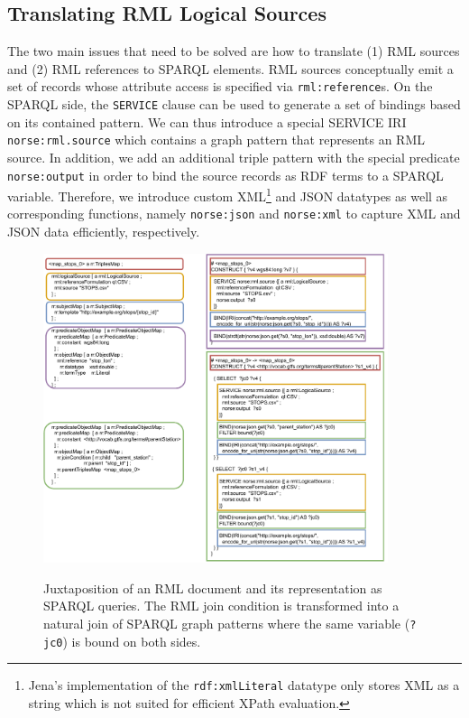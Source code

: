 \subsection{Translating RML Logical Sources}\label{sec:NORSE}
The two main issues that need to be solved are how to translate (1) RML sources and (2) RML references to SPARQL elements.
RML sources conceptually emit a set of records whose attribute access is specified via \texttt{rml:reference}s.
On the SPARQL side, the \texttt{SERVICE} clause can be used to generate a set of bindings based on its contained pattern.
We can thus introduce a special SERVICE IRI \texttt{norse:rml.source} which contains a graph pattern that represents an RML source.
In addition, we add an additional triple pattern with the special predicate \texttt{norse:output} in order to bind the source records as RDF terms to a SPARQL variable.
Therefore, we introduce custom XML\footnote{Jena's implementation of the \texttt{rdf:xmlLiteral} datatype only stores XML as a string which is not suited for efficient XPath evaluation.} and JSON datatypes as well as corresponding functions, namely \texttt{norse:json} and \texttt{norse:xml} to capture XML and JSON data efficiently, respectively.


\begin{figure}[htb]
\centering
\includegraphics[width=0.9\textwidth]{images/rml-to-sparql.pdf}
%
\label{fig:rml-to-sparql}
\caption{Juxtaposition of an RML document and its representation as SPARQL queries. The RML join condition is transformed into a natural join of SPARQL graph patterns where the same variable (\texttt{?jc0}) is bound on both sides.}
\end{figure}

